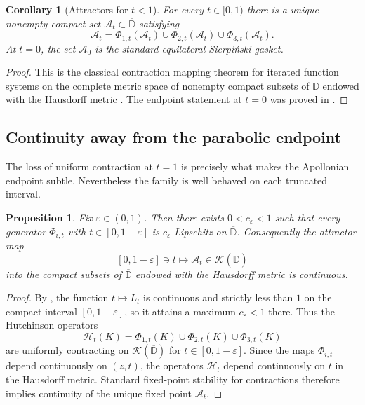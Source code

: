 \documentclass[11pt]{amsart}
\newtheorem{proposition}[proposition]{Proposition}
\newtheorem{corollary}[corollary]{Corollary}
\theoremstyle{definition}
\newcommand{\Disk}{\overline{\mathbb{D}}}
\begin{document}
\begin{corollary}[Attractors for $t<1$]\label{ap:cor:attractor}
For every $t\in[0,1)$ there is a unique nonempty compact set $\mathcal A_t\subset\Disk$ satisfying
\[
  \mathcal A_t=\Phi_{1,t}(\mathcal A_t)\cup\Phi_{2,t}(\mathcal A_t)\cup\Phi_{3,t}(\mathcal A_t).
\]
At $t=0$, the set $\mathcal A_0$ is the standard equilateral Sierpi\'nski gasket.
\end{corollary}

\begin{proof}
This is the classical contraction mapping theorem for iterated function systems on the complete metric space of nonempty compact subsets of $\Disk$ endowed with the Hausdorff metric \cite{Hutchinson1981}. The endpoint statement at $t=0$ was proved in .
\end{proof}

\subsection{Continuity away from the parabolic endpoint}
The loss of uniform contraction at $t=1$ is precisely what makes the Apollonian endpoint subtle. Nevertheless the family is well behaved on each truncated interval.

\begin{proposition}\label{ap:prop:continuity}
Fix $\varepsilon\in(0,1)$. Then there exists $0<c_\varepsilon<1$ such that every generator $\Phi_{i,t}$ with $t\in[0,1-\varepsilon]$ is $c_\varepsilon$-Lipschitz on $\Disk$. Consequently the attractor map
\[
  [0,1-\varepsilon]\ni t\longmapsto \mathcal A_t\in\mathcal{K}(\Disk)
\]
into the compact subsets of $\Disk$ endowed with the Hausdorff metric is continuous.
\end{proposition}

\begin{proof}
By , the function $t\mapsto L_t$ is continuous and strictly less than $1$ on the compact interval $[0,1-\varepsilon]$, so it attains a maximum $c_\varepsilon<1$ there. Thus the Hutchinson operators
\[
  \mathcal{H}_t(K)=\Phi_{1,t}(K)\cup\Phi_{2,t}(K)\cup\Phi_{3,t}(K)
\]
are uniformly contracting on $\mathcal{K}(\Disk)$ for $t\in[0,1-\varepsilon]$. Since the maps $\Phi_{i,t}$ depend continuously on $(z,t)$, the operators $\mathcal{H}_t$ depend continuously on $t$ in the Hausdorff metric. Standard fixed-point stability for contractions therefore implies continuity of the unique fixed point $\mathcal A_t$.
\end{proof}
\end{document}
